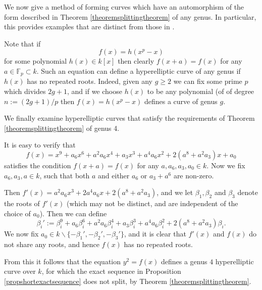 We now give a method of forming curves which have an automorphism of the form described in Theorem \ref{theoremsplittingtheorem} of any genus.
In particular, this provides examples that are distinct from those in \cite{canonicalrepresentation}.

    \begin{ex}
    Note that if
        \[
        f(x) = h(x^p - x)
        \]
    for some polynomial $h(x) \in k[x]$ then clearly $f(x + a) = f(x)$ for any $ a \in \mathbb F_p \subset k$.
    Such an equation can define a hyperelliptic curve of any genus if $h(x)$ has no repeated roots.
    Indeed, given any $g \geq 2$ we can fix some prime $p$ which divides $2g+1$, and if we choose $h(x)$ to be any polynomial (of of degree $n := (2g+1)/p$ then $f(x) = h(x^p - x)$ defines a curve of genus $g$.
    \end{ex}

We finally examine hyperelliptic curves that satisfy the requirements of Theorem \ref{theoremsplittingtheorem} of genus 4.

    \begin{ex}
    It is easy to verify that
    \begin{equation*}
    f(x) = x^9 + a_6x^6 + a^2a_6x^4 + a_3x^3 + a^4a_6x^2 + 2(a^8 + a^2a_3)x + a_0
    \end{equation*}
    satisfies the condition $f(x+a) = f(x)$ for any $a, a_6, a_3, a_0 \in k$.
    Now we fix $a_6, a_3, a \in k$, such that both $a$ and either $a_6$ or $a_3 + a^6$ are non-zero.
    
    Then $f'(x) = a^2a_6x^3 + 2a^4a_6x + 2(a^8 + a^2a_3)$, and we let $\beta_1, \beta_2$ and $\beta_3$ denote the roots of $f'(x)$ (which may not be distinct, and are independent of the choice of $a_0$).
    Then we can define
    \[
    \beta_i' :=\beta_i^9 + a_6\beta_i^6 + a^2a_6\beta_i^4 + a_3\beta_i^3 + a^4a_6\beta_i^2 + 2(a^8 + a^2a_3)\beta_i.
    \]
    We now fix $a_0 \in k \backslash \{-\beta_1', -\beta_2', -\beta_3'\}$, and it is clear that $f'(x)$ and $f(x)$ do not share any roots, and hence $f(x)$ has no repeated roots.
    
    
    From this it follows that the equation $y^2 = f(x)$ defines a genus $4$ hyperelliptic curve over $k$, for which the exact sequence in Proposition \ref{propshortexactsequence} does not split, by Theorem \ref{theoremsplittingtheorem}.
    \end{ex}




